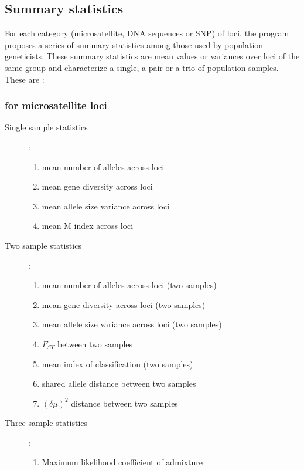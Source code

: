 \subsection{Summary statistics}
For each category (microsatellite, DNA sequences or SNP) of loci, the program proposes a series of  summary statistics among those used by population geneticists. These summary statistics are mean values or variances over loci of the same group and 
characterize a single, a pair or a trio of population samples. These are :
\subsubsection{for microsatellite loci}
\begin{description}
\item[Single sample statistics] : 
\begin{enumerate}
  \item mean number of alleles across loci 
  \item mean gene diversity across loci \citep{N1987}
  \item mean allele size variance across loci 
  \item mean M index across loci \citep{GW2001, Ex2005}
 \end{enumerate}
\item[Two sample statistics] :
\begin{enumerate}
  \item mean number of alleles across loci (two samples)
  \item mean gene diversity across loci (two samples)
  \item mean allele size variance across loci (two samples)
  \item $F_{ST}$ between two samples \citep{WC1984}
  \item mean index of classification (two samples) \citep{RM1997,PC2007}
  \item shared allele distance between two samples \citep{CJ1993}
  \item $(\delta\mu)^2$ distance between two samples \citep{GL1995}
  \end{enumerate}
\item[Three sample statistics] :
\begin{enumerate}
  \item Maximum likelihood coefficient of admixture  \citep{CF2004} 
\end{enumerate}
\end{description}

